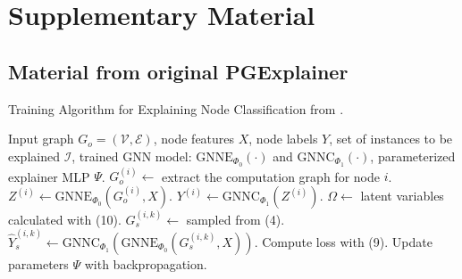 \chapter{Supplementary Material}

\section{Material from original PGExplainer}
\label{sec:PGE_material}

\begin{algorithm}
    \caption{Training Algorithm for Explaining Node Classification from \cite{luo2020parameterized}.}
    \label{alg:node-alg}
    \begin{algorithmic}[1]
    \REQUIRE Input graph $G_o = (\mathcal{V}, \mathcal{E})$, node features $X$, node labels $Y$, set of instances to be explained $\mathcal{I}$, trained GNN model: $\text{GNNE}_{\Phi_0}(\cdot)$ and $\text{GNNC}_{\Phi_1}(\cdot)$, parameterized explainer MLP $\Psi$.
        \STATE $G^{(i)}_o \leftarrow$ extract the computation graph for node $i$.
        \STATE $Z^{(i)} \leftarrow \text{GNNE}_{\Phi_0}(G^{(i)}_o, X)$.
        \STATE $Y^{(i)} \leftarrow \text{GNNC}_{\Phi_1}(Z^{(i)})$.
    \ENDFOR
            \STATE $\Omega \leftarrow$ latent variables calculated with (10).
                \STATE $G^{(i,k)}_s \leftarrow$ sampled from (4).
                \STATE $\hat{Y}^{(i,k)}_s \leftarrow \text{GNNC}_{\Phi_1}(\text{GNNE}_{\Phi_0}(G^{(i,k)}_s, X))$.
            \ENDFOR
        \ENDFOR
        \STATE Compute loss with (9).
        \STATE Update parameters $\Psi$ with backpropagation.
    \ENDFOR
    \end{algorithmic}
    \end{algorithm}
    
    \vspace{0.5cm}
    
